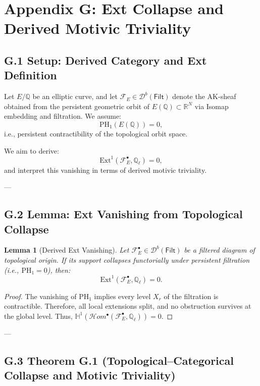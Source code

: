 \documentclass[11pt]{article}
\newtheorem{lemma}[theorem]{Lemma}
\theoremstyle{definition}
\begin{document}
\section*{Appendix G: Ext Collapse and Derived Motivic Triviality}

\subsection*{G.1 Setup: Derived Category and Ext Definition}

Let \( E/\mathbb{Q} \) be an elliptic curve, and let \( \mathcal{F}_E \in \mathcal{D}^b(\mathsf{Filt}) \) denote the AK-sheaf obtained from the persistent geometric orbit of \( E(\mathbb{Q}) \subset \mathbb{R}^N \) via Isomap embedding and filtration.  
We assume:
\[
\mathrm{PH}_1(E(\mathbb{Q})) = 0,
\]
i.e., persistent contractibility of the topological orbit space.

We aim to derive:
\[
\mathrm{Ext}^1(\mathcal{F}_E^\bullet, \mathbb{Q}_\ell) = 0,
\]
and interpret this vanishing in terms of derived motivic triviality.

---

\subsection*{G.2 Lemma: Ext Vanishing from Topological Collapse}

\begin{lemma}[Derived Ext Vanishing]
Let \( \mathcal{F}_E^\bullet \in \mathcal{D}^b(\mathsf{Filt}) \) be a filtered diagram of topological origin.  
If its support collapses functorially under persistent filtration (i.e., \( \mathrm{PH}_1 = 0 \)), then:
\[
\mathrm{Ext}^1(\mathcal{F}_E^\bullet, \mathbb{Q}_\ell) = 0.
\]
\end{lemma}

\begin{proof}
The vanishing of \( \mathrm{PH}_1 \) implies every level \( X_r \) of the filtration is contractible.  
Therefore, all local extensions split, and no obstruction survives at the global level.  
Thus, \( \mathbb{H}^1(\mathcal{H}om^\bullet(\mathcal{F}_E^\bullet, \mathbb{Q}_\ell)) = 0 \).
\end{proof}

---

\subsection*{G.3 Theorem G.1 (Topological–Categorical Collapse and Motivic Triviality)}
\end{document}
